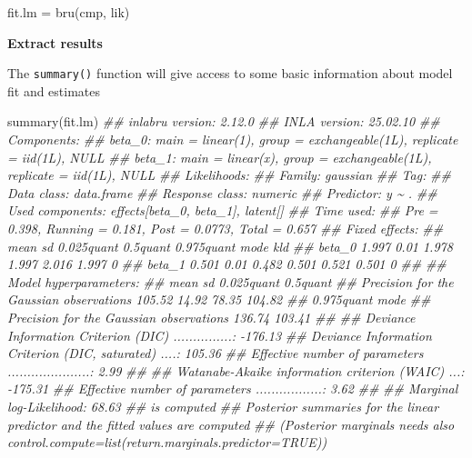 \documentclass[
  letterpaper,
  DIV=11,
  numbers=noendperiod]{scrartcl}
\newenvironment{Shaded}{\begin{snugshade}}{\end{snugshade}}
\newcommand{\DocumentationTok}[1]{\textcolor[rgb]{0.37,0.37,0.37}{\textit{#1}}}
\newcommand{\FunctionTok}[1]{\textcolor[rgb]{0.28,0.35,0.67}{#1}}
\newcommand{\NormalTok}[1]{\textcolor[rgb]{0.00,0.23,0.31}{#1}}
\newcommand{\OtherTok}[1]{\textcolor[rgb]{0.00,0.23,0.31}{#1}}
\begin{document}
\begin{Shaded}
\begin{Highlighting}[]
\NormalTok{fit.lm }\OtherTok{=} \FunctionTok{bru}\NormalTok{(cmp, lik)}
\end{Highlighting}
\end{Shaded}

\textbf{Extract results}

The \texttt{summary()} function will give access to some basic
information about model fit and estimates

\begin{Shaded}
\begin{Highlighting}[]
\FunctionTok{summary}\NormalTok{(fit.lm)}
\DocumentationTok{\#\# inlabru version: 2.12.0}
\DocumentationTok{\#\# INLA version: 25.02.10}
\DocumentationTok{\#\# Components:}
\DocumentationTok{\#\# beta\_0: main = linear(1), group = exchangeable(1L), replicate = iid(1L), NULL}
\DocumentationTok{\#\# beta\_1: main = linear(x), group = exchangeable(1L), replicate = iid(1L), NULL}
\DocumentationTok{\#\# Likelihoods:}
\DocumentationTok{\#\#   Family: \textquotesingle{}gaussian\textquotesingle{}}
\DocumentationTok{\#\#     Tag: \textquotesingle{}\textquotesingle{}}
\DocumentationTok{\#\#     Data class: \textquotesingle{}data.frame\textquotesingle{}}
\DocumentationTok{\#\#     Response class: \textquotesingle{}numeric\textquotesingle{}}
\DocumentationTok{\#\#     Predictor: y \textasciitilde{} .}
\DocumentationTok{\#\#     Used components: effects[beta\_0, beta\_1], latent[]}
\DocumentationTok{\#\# Time used:}
\DocumentationTok{\#\#     Pre = 0.398, Running = 0.181, Post = 0.0773, Total = 0.657 }
\DocumentationTok{\#\# Fixed effects:}
\DocumentationTok{\#\#         mean   sd 0.025quant 0.5quant 0.975quant  mode kld}
\DocumentationTok{\#\# beta\_0 1.997 0.01      1.978    1.997      2.016 1.997   0}
\DocumentationTok{\#\# beta\_1 0.501 0.01      0.482    0.501      0.521 0.501   0}
\DocumentationTok{\#\# }
\DocumentationTok{\#\# Model hyperparameters:}
\DocumentationTok{\#\#                                           mean    sd 0.025quant 0.5quant}
\DocumentationTok{\#\# Precision for the Gaussian observations 105.52 14.92      78.35   104.82}
\DocumentationTok{\#\#                                         0.975quant   mode}
\DocumentationTok{\#\# Precision for the Gaussian observations     136.74 103.41}
\DocumentationTok{\#\# }
\DocumentationTok{\#\# Deviance Information Criterion (DIC) ...............: {-}176.13}
\DocumentationTok{\#\# Deviance Information Criterion (DIC, saturated) ....: 105.36}
\DocumentationTok{\#\# Effective number of parameters .....................: 2.99}
\DocumentationTok{\#\# }
\DocumentationTok{\#\# Watanabe{-}Akaike information criterion (WAIC) ...: {-}175.31}
\DocumentationTok{\#\# Effective number of parameters .................: 3.62}
\DocumentationTok{\#\# }
\DocumentationTok{\#\# Marginal log{-}Likelihood:  68.63 }
\DocumentationTok{\#\#  is computed }
\DocumentationTok{\#\# Posterior summaries for the linear predictor and the fitted values are computed}
\DocumentationTok{\#\# (Posterior marginals needs also \textquotesingle{}control.compute=list(return.marginals.predictor=TRUE)\textquotesingle{})}
\end{Highlighting}
\end{Shaded}
\end{document}
